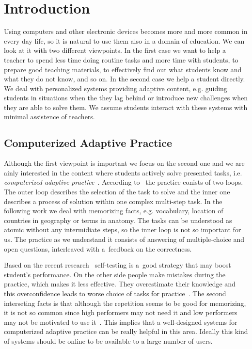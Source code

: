 \documentclass[table,color]{fithesis3/fithesis3}
\begin{document}
\chapter{Introduction}

Using computers and other electronic devices becomes more and mo\-re common in
every day life, so it is natural to use them also in a domain of education. We
can look at it with two different viewpoints. In the first case we want to help
a teacher to spend less time doing routine tasks and more time with students,
to prepare good teaching materials, to effectively find out what students
know and what they do not know, and so on. In the second case we help
a student directly. We deal with personalized systems providing adaptive
content, e.g. guiding students in situations when the they lag behind
or introduce new challenges when they are able to solve them. We assume
students interact with these systems with minimal assistence of teachers.

\section{Computerized Adaptive Practice}

Although the first viewpoint is important we focus on the second one and we are
ainly interested in the content where students actively solve presented tasks,
i.e. \emph{computerized adaptive practice}~\cite{klinkenberg2011computer}.
According to~\cite{vanlehn2006behavior} the practice conists of two loops. The
outer loop describes the selection of the task to solve and the inner one
describes a process of solution within one complex multi-step task. In the
following work we deal with memorizing facts, e.g. vocabulary, location of
countries in geography or terms in anatomy. The tasks can be understood as
atomic without any intermidiate steps, so the inner loop is not so important
for us. The practice as we understand it consists of answering of
multiple-choice and open questions, interleaved with a~feedback on the
correctness.

Based on the recent research~\cite{bjork2013self} self-testing is a~good
strategy that may boost student's performance. On the other side people make
mistakes during the practice, which makes it less effective. They overestimate
their knowledge and this overconfidence leads to worse choice of tasks for
practice~\cite{bjork2013self,kornell2008optimising}. The second interseting
facts is that although the repetition seems to be good for memorizing, it is
not so common since high performers may not need it and low performers may not
be motivated to use it~\cite{bjork2013self}. This implies that a well-designed
systems for computerized adaptive practice can be really helpful in this area.
Ideally this kind of systems should be online to be available to a large number
of users.
\end{document}
